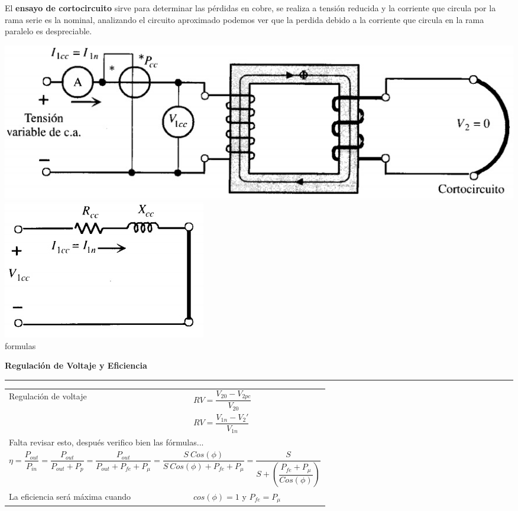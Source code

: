 \documentclass[11pt,a4paper]{article}
\newcommand{\subtitulo}[1]{
	\textbf{#1} \\ \vspace{.1cm} {\color{gray} \hrule}
}
\begin{document}
\begin{cajita}
\begin{flushleft}
		El \textbf{ensayo de cortocircuito} sirve para determinar las pérdidas en cobre, se realiza a tensión reducida y la corriente que circula por la rama serie es la nominal, analizando el circuito aproximado podemos ver que la perdida debido a la corriente que circula en la rama paralelo es despreciable. 
			\begin{multicols}{2}
			\includegraphics[width=0.9\linewidth]{ensayo-cc-1}\\
			\includegraphics[width=.4\linewidth]{ensayo-cc-2}\\
			
			\columnbreak
			formulas
			
		\end{multicols}

	\end{flushleft}
	
	
	\subtitulo{Regulación de Voltaje y Eficiencia}
	
	\vspace{.3cm}
	\begin{tabular}{l l}
		Regulación de voltaje & $RV=\dfrac{V_{20}-V_{2pc}}{V_{20}}$ \vspace{.2cm} \\
		& $RV = \dfrac{V_{1n} - V_2'}{V_{1n}}$ \vspace{.2cm}\\
		\multicolumn{2}{l}{Falta revisar esto, después verifico bien las fórmulas... \vspace{.2cm}} \\
		\multicolumn{2}{c}{$\eta = \dfrac{P_{out}}{P_{in}}=\dfrac{P_{out}}{P_{out}+P_{p}}=\dfrac{P_{out}}{P_{out}+P_{fe}+P_{\mu}}
			= \dfrac{S~Cos(\phi)}{S~Cos(\phi )+P_{fe}+P_{\mu}}=
			\dfrac{S}{S+\left(\dfrac{P_{fe}+P_{\mu}}{Cos(\phi)}\right)}$}\\
		
		La eficiencia será máxima cuando & $cos(\phi)=1$ y $ P_{fe}=P_{\mu }$ \\

	\end{tabular}
		
	
	
	
\end{cajita}
\end{document}
